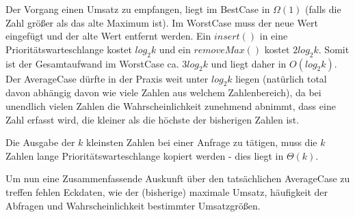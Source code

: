 \documentclass{article}
\begin{document}
Der Vorgang einen Umsatz zu empfangen, liegt im BestCase in $\Omega(1)$ (falls die Zahl größer als das alte
Maximum ist). Im WorstCase muss der neue Wert eingefügt und der alte Wert entfernt werden. Ein $insert()$
in eine Prioritätswarteschlange kostet $log_2k$ und ein $removeMax()$ kostet $2log_2k$. Somit ist der 
Gesamtaufwand im WorstCase ca. $3log_2k$ und liegt daher in $O(log_2k)$. Der AverageCase dürfte in der Praxis
weit unter $log_2k$ liegen (natürlich total davon abhängig davon wie viele Zahlen aus welchem Zahlenbereich),
da bei unendlich vielen Zahlen die Wahrscheinlichkeit zunehmend abnimmt, dass eine Zahl erfasst wird, die
kleiner als die höchste der bisherigen Zahlen ist.

Die Ausgabe der $k$ kleinsten Zahlen bei einer Anfrage zu tätigen, muss die $k$ Zahlen lange Prioritätswarteschlange
kopiert werden - dies liegt in $\Theta(k)$.

Um nun eine Zusammenfassende Auskunft über den tatsächlichen AverageCase zu treffen fehlen Eckdaten, wie
der (bisherige) maximale Umsatz, häufigkeit der Abfragen und Wahrscheinlichkeit bestimmter Umsatzgrößen.
\end{document}
